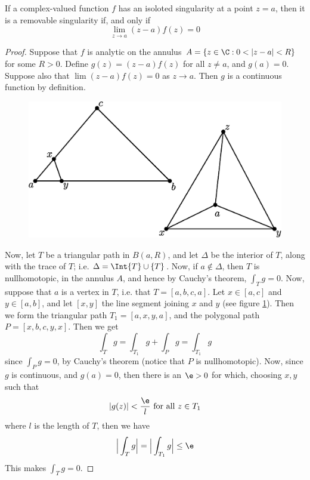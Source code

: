 \begin{theorem}\label{5.1.1}
    If a complex-valued function $f$ has an isoloted singularity at a point
    $z=a$, then it is a removable singularity if, and only if
    \begin{equation*}
        \lim_{z \xrightarrow{} a}{(z-a)f(z)}=0
    \end{equation*}
\end{theorem}
\begin{proof}
    Suppose that $f$ is analytic on the annulus $A=\{z \in \C : 0<|z-a|<R\}$
    for some $R>0$. Define  $g(z)=(z-a)f(z)$ for all $z \neq a$, and  $g(a)=0$.
    Suppose also that $\lim{(z-a)f(z)}=0$ as $z \xrightarrow{} a$. Then $g$ is a
    continuous function by definition.

     \begin{figure}[h]
        \centering
        \includegraphics[scale=0.5]{Figures/chapter5/isolated_sigularities.eps}
        \caption{}
        \label{figure_5.1}
    \end{figure}

    Now, let $T$ be a triangular path in  $B(a,R)$, and let $\Delta$ be the
    interior of $T$, along with the trace of $T$; i.e.  $\Delta=\Int{T} \cup
    \{T\}$. Now, if $a \notin \Delta$, then  $T$ is nullhomotopic, in the
    annulus  $A$, and hence by Cauchy's theorem,  $\int_T{g}=0$. Now, suppose
    that $a$ is a vertex in  $T$, i.e. that  $T=[a,b,c,a]$. Let $x \in [a,c]$
    and $y \in [a,b]$, and let $[x,y]$ the line segment joining $x$ and  $y$
    (see figure \ref{figure_5.1}). Then we form the triangular path
    $T_1=[a,x,y,a]$, and the polygonal path $P=[x,b,c,y,x]$. Then we get
    \begin{equation*}
        \int_T{g}=\int_{T_1}{g}+\int_{P}{g}=\int_{T_1}{g}
    \end{equation*}
    since $\int_P{g}=0$, by Cauchy's theorem (notice that $P$ is nullhomotopic).
    Now, since $g$ is continuous, and  $g(a)=0$, then there is an $\e>0$ for
    which, choosing  $x,y$ such that
    \begin{equation*}
        |g(z)|<\frac{\e}{l} \text{ for all } z \in T_1
    \end{equation*}
    where $l$ is the length of $T$, then we have
    \begin{equation*}
        \Big{|} \int_{T}{g} \Big{|}=\Big{|} \int_{T_1}{g} \Big{|} \leq \e
    \end{equation*}
    This makes $\int_T{g}=0$.


\end{proof}
